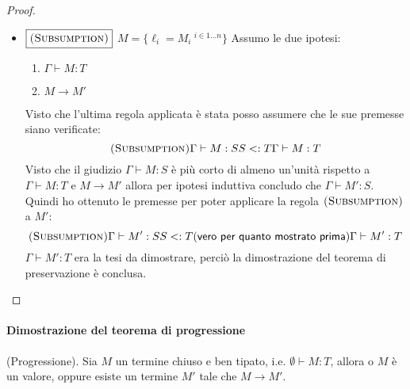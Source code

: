 \begin{proof}
\begin{itemize}
\begin{itemize}
		Visto che la lunghezza della derivazione del giudizio di tipo per $N$ \`e strettamente inferiore di quella 
		per $N.\ell_j$ e vale $ N.\ell_j \longrightarrow N'.\ell_j$ (perch\`e $N$ non \`e un valore) vale anche la premessa
		alla regola $\myrule{Eval-Select}$ e quindi $N \longrightarrow N'$.
		Quindi posso applicare l'ipotesi induttiva e concludere che $N'$ ha lo stesso
		tipo di $N$, ovvero $\{\ell_i : T_i\ ^{i \in 1 \dots n} \}$.
		Applicando la regola $\myrule{Type-Select}$ ed usando
		$N' : \{\ell_i : T_i\ ^{i \in 1 \dots n} \}$ come premessa ottengo il risultato
		cercato, ovvero $N'.\ell_j : T_j$.
	
		\item $\boxed{\textsc{(Subsumption)}}$ $M = \{\ell_i = M_i\ ^{i \in 1 \dots n} \}$ Assumo le due ipotesi:
		\begin{enumerate}
			\item $\Gamma \vdash M : T$
			\item $M \longrightarrow M'$
		\end{enumerate} 
		Visto che l'ultima regola applicata \`e stata  posso assumere che le sue premesse siano verificate:
		$$
		{\textsc{(Subsumption)}}
		{\Gamma \vdash M : S}
		{S <: T}
		{\Gamma \vdash M : T}
		$$
		Visto che il giudizio $\Gamma \vdash M : S$ \`e pi\`u corto di almeno un'unit\`a rispetto a $\Gamma \vdash M : T$ e $M \longrightarrow M'$
		allora per ipotesi induttiva concludo che $\Gamma \vdash M' : S$. 
		Quindi ho ottenuto le premesse per poter applicare la regola $\textsc{(Subsumption)}$ a $M'$:
		$$
		{\myrule{Subsumption}}
		{\Gamma \vdash M' : S}
		{S <: T (\text{vero per quanto mostrato prima})}
		{\Gamma \vdash M' : T}
		$$
		$\Gamma \vdash M' : T$ era la tesi da dimostrare, perci\`o la dimostrazione del
		teorema di preservazione \`e conclusa.
	
	\end{itemize}
\end{itemize}
\end{proof}


\paragraph{Dimostrazione del teorema di progressione}
(Progressione).
	 Sia $M$ un termine chiuso e ben tipato, i.e. $\emptyset \vdash M : T $, allora o $M$ \`e un
	valore, oppure esiste un termine $M'$ tale che $M \longrightarrow M'$.

